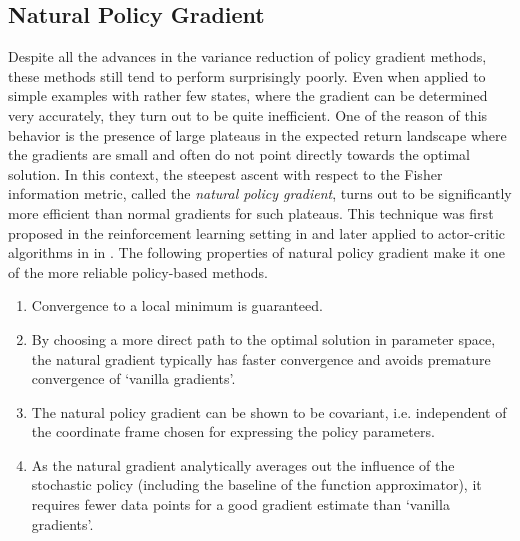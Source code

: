 \subsection{Natural Policy Gradient}
Despite all the advances in the variance reduction of policy gradient methods, these methods still tend to perform surprisingly poorly. Even when applied to simple examples with rather few states, where the gradient can be determined very accurately, they turn out to be quite inefficient. One of the reason of this behavior is the presence of large plateaus in the expected return landscape where the gradients are small and often do not point directly towards the optimal solution. In this context, the steepest ascent with respect to the Fisher information metric, called the \emph{natural policy gradient}, turns out to be significantly more efficient than normal gradients for such
plateaus. This technique was first proposed in the reinforcement learning setting in \cite{kakade2001natural} and later applied to actor-critic algorithms in in \cite{peters2008reinforcement}. The following properties of natural policy gradient make it one of the more reliable policy-based methods. 
\begin{enumerate}[label={\roman*)}]
	\item Convergence to a local minimum is guaranteed.
	\item By choosing a more direct path to the optimal solution in parameter space, the natural gradient typically has faster convergence and avoids premature convergence of ‘vanilla gradients’.
	\item  The natural policy gradient can be shown to be covariant, i.e. independent of the coordinate frame chosen for expressing the policy parameters.
	\item As the natural gradient analytically averages out the influence of the stochastic policy (including the baseline of the function approximator), it requires fewer data points for a good gradient estimate than ‘vanilla gradients’.
\end{enumerate}

